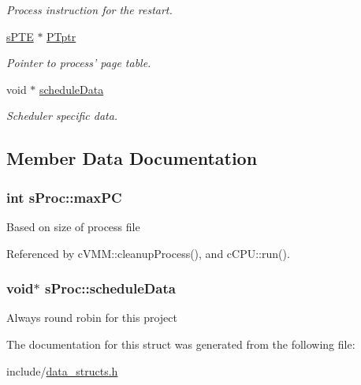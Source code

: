 \begin{DoxyCompactItemize}
\begin{DoxyCompactList}\small\item\em \-Process instruction for the restart. \end{DoxyCompactList}\item 
\hypertarget{structsProc_a469832c44beab71535219bc020956dcd}{\hyperlink{structsPTE}{s\-P\-T\-E} $\ast$ \hyperlink{structsProc_a469832c44beab71535219bc020956dcd}{\-P\-Tptr}}\label{d4/d8e/structsProc_a469832c44beab71535219bc020956dcd}

\begin{DoxyCompactList}\small\item\em \-Pointer to process' page table. \end{DoxyCompactList}\item 
void $\ast$ \hyperlink{structsProc_ab2e14e8d2e13b2d661c81e25d7bb2b2c}{schedule\-Data}
\begin{DoxyCompactList}\small\item\em \-Scheduler specific data. \end{DoxyCompactList}\end{DoxyCompactItemize}


\subsection{\-Member \-Data \-Documentation}
\hypertarget{structsProc_a915cc193d810601697481767854a9b05}{
\subsubsection[{max\-P\-C}]{\setlength{\rightskip}{0pt plus 5cm}int {\bf s\-Proc\-::max\-P\-C}}}\label{d4/d8e/structsProc_a915cc193d810601697481767854a9b05}
\-Based on size of process file 

\-Referenced by c\-V\-M\-M\-::cleanup\-Process(), and c\-C\-P\-U\-::run().

\hypertarget{structsProc_ab2e14e8d2e13b2d661c81e25d7bb2b2c}{
\subsubsection[{schedule\-Data}]{\setlength{\rightskip}{0pt plus 5cm}void$\ast$ {\bf s\-Proc\-::schedule\-Data}}}\label{d4/d8e/structsProc_ab2e14e8d2e13b2d661c81e25d7bb2b2c}
\-Always round robin for this project 

\-The documentation for this struct was generated from the following file\-:\begin{DoxyCompactItemize}
\item 
include/\hyperlink{data__structs_8h}{data\-\_\-structs.\-h}\end{DoxyCompactItemize}
